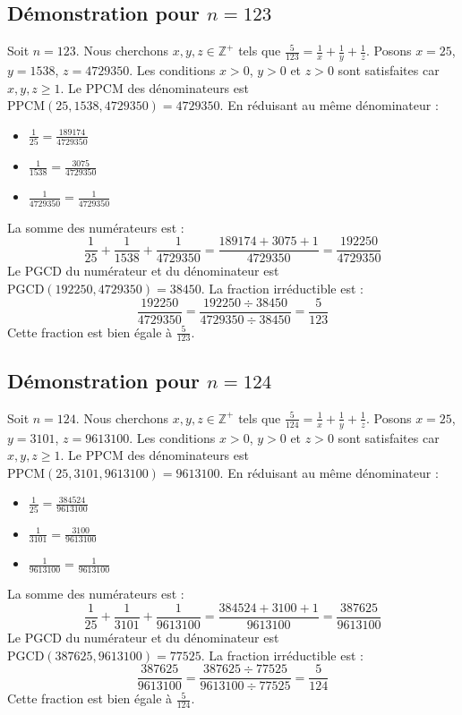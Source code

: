 \documentclass[11pt,a4paper]{article}
\begin{document}
\subsection{Démonstration pour $n = 123$}
Soit $n = 123$. Nous cherchons $x, y, z \in \mathbb{Z}^{+}$ tels que $\frac{5}{123} = \frac{1}{x} + \frac{1}{y} + \frac{1}{z}$.
Posons $x = 25$, $y = 1538$, $z = 4729350$.
Les conditions $x > 0$, $y > 0$ et $z > 0$ sont satisfaites car $x, y, z \geq 1$.
Le PPCM des dénominateurs est $\text{PPCM}(25, 1538, 4729350) = 4729350$.
En réduisant au même dénominateur :
\begin{itemize}
    \item $\frac{1}{25} = \frac{189174}{4729350}$
    \item $\frac{1}{1538} = \frac{3075}{4729350}$
    \item $\frac{1}{4729350} = \frac{1}{4729350}$
\end{itemize}
La somme des numérateurs est :
$$ \frac{1}{25} + \frac{1}{1538} + \frac{1}{4729350} = \frac{189174 + 3075 + 1}{4729350} = \frac{192250}{4729350} $$
Le PGCD du numérateur et du dénominateur est $\text{PGCD}(192250, 4729350) = 38450$.
La fraction irréductible est :
$$ \frac{192250}{4729350} = \frac{192250 \div 38450}{4729350 \div 38450} = \frac{5}{123} $$
Cette fraction est bien égale à $\frac{5}{123}$.

\subsection{Démonstration pour $n = 124$}
Soit $n = 124$. Nous cherchons $x, y, z \in \mathbb{Z}^{+}$ tels que $\frac{5}{124} = \frac{1}{x} + \frac{1}{y} + \frac{1}{z}$.
Posons $x = 25$, $y = 3101$, $z = 9613100$.
Les conditions $x > 0$, $y > 0$ et $z > 0$ sont satisfaites car $x, y, z \geq 1$.
Le PPCM des dénominateurs est $\text{PPCM}(25, 3101, 9613100) = 9613100$.
En réduisant au même dénominateur :
\begin{itemize}
    \item $\frac{1}{25} = \frac{384524}{9613100}$
    \item $\frac{1}{3101} = \frac{3100}{9613100}$
    \item $\frac{1}{9613100} = \frac{1}{9613100}$
\end{itemize}
La somme des numérateurs est :
$$ \frac{1}{25} + \frac{1}{3101} + \frac{1}{9613100} = \frac{384524 + 3100 + 1}{9613100} = \frac{387625}{9613100} $$
Le PGCD du numérateur et du dénominateur est $\text{PGCD}(387625, 9613100) = 77525$.
La fraction irréductible est :
$$ \frac{387625}{9613100} = \frac{387625 \div 77525}{9613100 \div 77525} = \frac{5}{124} $$
Cette fraction est bien égale à $\frac{5}{124}$.
\end{document}
